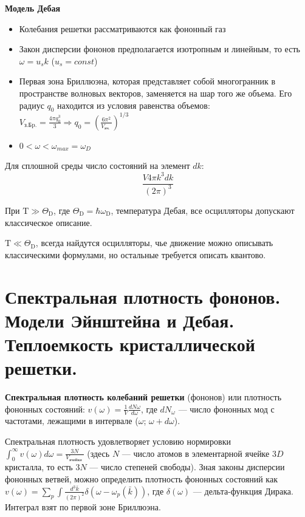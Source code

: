 \textbf{Модель Дебая}

\begin{itemize}
    \item Колебания решетки рассматриваются как фононный газ
    \item Закон дисперсии фононов предполагается изотропным и линейным, то есть $\omega=u_sk$ ($u_s = const$)
    \item Первая зона Бриллюэна, которая представляет собой многогранник в пространстве волновых векторов, заменяется на шар того же объема. Его радиус $q_0$ находится из условия равенства объемов: $V_{\text{з.Бp.}}=\frac{4 \pi q_0^3}{3} \Rightarrow q_0=\left(\frac{6 \pi^2}{V_{\text {яч. }}}\right)^{1 / 3}$
    \item $0<\omega<\omega_{max}=\omega_D$
\end{itemize}

Для сплошной среды число состояний на элемент $dk$: 
\begin{equation}
    \frac{V 4 \pi k^3 d k}{(2 \pi)^3}
\end{equation}

При $\mathrm{T} \gg \Theta_{\mathrm{D}}$, где $\Theta_{\mathrm{D}}=\hbar \omega_{\mathrm{D}}$, температура Дебая, все осцилляторы допускают классическое описание.

$\mathrm{T} \ll \Theta_{\mathrm{D}}$, всегда найдутся осцилляторы, чье движение можно описывать классическими формулами, но остальные требуется описать квантово. 

\section{Спектральная плотность фононов. Модели Эйнштейна и Дебая. 
Теплоемкость кристаллической решетки.}

\textbf{Спектральная плотность колебаний решетки} (фононов) или плотность фононных состояний: $v(\omega)=\frac{1}{V} \frac{d N \omega}{d \omega}$, где $dN_\omega$ --- число фононных мод с частотами, лежащими в интервале ($\omega$; $\omega + d \omega$).

Спектральная плотность удовлетворяет условию нормировки $\displaystyle \int_0^{\infty} v(\omega) d \omega=\frac{3 N}{V_{\text {ячейки }}}$ (здесь $N$
--- число атомов в элементарной ячейке $3D$ кристалла, то есть $3N$ --- число степеней свободы). Зная законы дисперсии фононных ветвей, можно определить плотность фононных состояний как $\displaystyle v(\omega)=\sum_p \int \frac{d^3 \bar{k}}{(2 \pi)^2} \delta\left(\omega-\omega_p(\bar{k})\right)$, где $\delta(\omega)$ --- дельта-функция Дирака. Интеграл взят по первой зоне Бриллюэна. 

